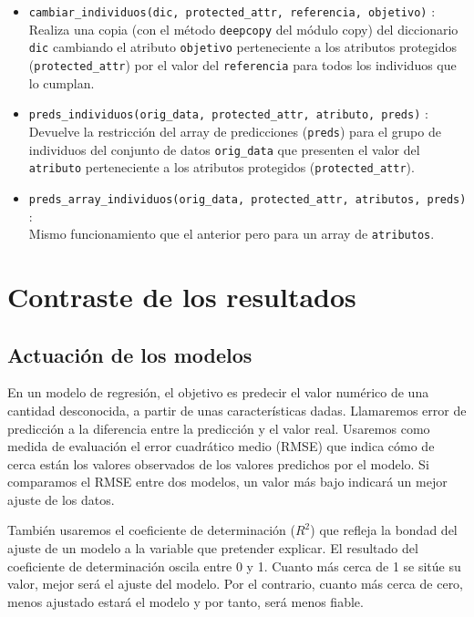\documentclass[oneside,openright,titlepage,numbers=noenddot,openany,headinclude,footinclude=true,
cleardoublepage=empty,abstractoff,BCOR=5mm,paper=a4,fontsize=12pt,main=spanish]{scrreprt}
\begin{document}
\begin{itemize}
    \item \texttt{cambiar\_individuos(dic, protected\_attr, referencia, objetivo)} :\\
    Realiza una copia (con el método \texttt{deepcopy} del módulo copy) del diccionario \texttt{dic} cambiando el atributo \texttt{objetivo} perteneciente a los atributos protegidos (\texttt{protected\_attr}) por el valor del \texttt{referencia} para todos los individuos que lo cumplan.\\
    \item \texttt{preds\_individuos(orig\_data, protected\_attr, atributo, preds)} :\\
    Devuelve la restricción del array de predicciones (\texttt{preds}) para el grupo de individuos del conjunto de datos \texttt{orig\_data} que presenten el valor del \texttt{atributo} perteneciente a los atributos protegidos (\texttt{protected\_attr}).\\
    \item \texttt{preds\_array\_individuos(orig\_data, protected\_attr, atributos, preds)} :\\
    Mismo funcionamiento que el anterior pero para un array de \texttt{atributos}.
\end{itemize}

\section{Contraste de los resultados} \label{sec:contrastresults}

\subsection{Actuación de los modelos}

En un modelo de regresión, el objetivo es predecir el valor numérico de una cantidad desconocida, a partir de unas características dadas. Llamaremos error de predicción a la diferencia entre la predicción y el valor real. Usaremos como medida de evaluación el error cuadrático medio (RMSE) que indica cómo de cerca están los valores observados de los valores predichos por el modelo. Si comparamos el RMSE entre dos modelos, un valor más bajo indicará un mejor ajuste de los datos.

También usaremos el coeficiente de determinación ($R^2$) que refleja la bondad del ajuste de un modelo a la variable que pretender explicar. El resultado del coeficiente de determinación oscila entre 0 y 1. Cuanto más cerca de 1 se sitúe su valor, mejor será el ajuste del modelo. Por el contrario, cuanto más cerca de cero, menos ajustado estará el modelo y por tanto, será menos fiable.\\
\end{document}
